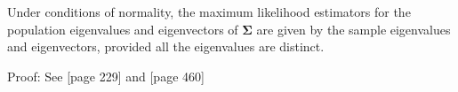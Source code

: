 \begin{theorem}
\label{th:evalmle}
Under conditions of normality, the maximum likelihood estimators for the population eigenvalues and eigenvectors of $\boldsymbol{\Sigma}$ are given by the sample eigenvalues and eigenvectors, provided all the eigenvalues are distinct.
\end{theorem}
Proof: See [page 229] \cite{Mardia+etal:1979} and [page 460] \cite{Anderson:1984}

